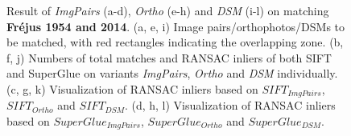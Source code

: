 \begin{figure}[htbp]
\begin{center}
{\begin{minipage}[t]{0.48\linewidth}
			\end{minipage}%
		}
		\caption{Result of \textit{ImgPairs} (a-d), \textit{Ortho} (e-h) and \textit{DSM} (i-l) on matching \textbf{Fr{\'e}jus 1954 and 2014}. (a, e, i) Image pairs/orthophotos/\ac{DSM}s to be matched, with red rectangles indicating the overlapping zone. (b, f, j) Numbers of total matches and RANSAC inliers of both SIFT and SuperGlue on variants \textit{ImgPairs}, \textit{Ortho} and \textit{DSM} individually. (c, g, k) Visualization of RANSAC inliers based on $SIFT_{ImgPairs}$, $SIFT_{Ortho}$ and $SIFT_{DSM}$. (d, h, l) Visualization of RANSAC inliers based on $SuperGlue_{ImgPairs}$, $SuperGlue_{Ortho}$ and $SuperGlue_{DSM}$.}
		\label{MatchVizFrejus1954DSM}
	\end{center}
\end{figure} 




